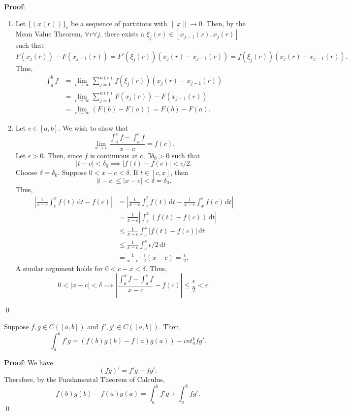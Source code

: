 \noindent \textbf{Proof}:
\begin{enumerate}
    \item Let $\{(\underline{x}(r))\}_r$ be a sequence of partitions with $\lVert \underline{x}\rVert \to 0$. Then, by the Mean Value Theorem, $\forall r\forall j$, there exists a $\xi_j(r)\in [x_{j-1}(r), x_j(r)]$ such that 
    \[
    F(x_j(r)) - F(x_{j-1}(r)) = F'(\xi_j(r))(x_j(r)-x_{j-1}(r)) = f(\xi_j(r)) (x_j(r)-x_{j-1}(r)).
    \]
    Thus, 
    \begin{align*}
        \int_a^b f &= \lim_{r\to \infty} \sum_{j=1}^{n(r)} f(\xi_j(r))(x_j(r)-x_{j-1}(r)) \\
        &= \lim_{r\to \infty} \sum_{j=1}^{n(r)} F(x_j(r)) - F(x_{j-1}(r)) \\
        &= \lim_{r\to \infty} (F(b)-F(a)) = F(b) - F(a).
    \end{align*}
    \item Let $c \in [a,b]$. We wish to show that 
    \[
    \lim_{x\to c} \frac{\int_a^x f- \int_a^c f}{x-c} = f(c).
    \]
    Let $\epsilon>0$. Then, since $f$ is continuous at $c$, $\exists \delta_0>0$ such that 
    \[
    |t-c|< \delta_0 \implies |f(t)-f(c)|<\epsilon/2.
    \]
    Choose $\delta = \delta_0$. Suppose $0< x-c<\delta$. If $t\in [c,x]$, then 
    \[
    |t-c|\leq |x-c| <\delta = \delta_0.
    \]
    Thus, 
    \begin{align*}
        \left|\frac{1}{x-c} \int_c^x f(t) \,\mathrm dt - f(c)\right| &= \left|\frac{1}{x-c}\int_c^t f(t) \,\mathrm dt - \frac{1}{x-c}\int_x^c f(c)\,\mathrm dt\right| \\
        &= \frac{1}{x-c} \left|\int_c^x (f(t)-f(c))\,\mathrm dt\right| \\
        &\leq \frac{1}{x-c}\int_c^x |f(t)-f(c)|\,\mathrm dt \\
        &\leq \frac{1}{x-c}\int_c^x \epsilon/2 \,\mathrm dt \\
        &= \frac{1}{x-c}\cdot \frac{\epsilon}{2} (x-c) = \frac{\epsilon}{2}.
    \end{align*}
    A similar argument holds for $0< c-x<\delta$. Thus, 
    \[
    0 < |x-c|< \delta \implies \left|\frac{\int_a^x f-\int_a^c f}{x-c} - f(c)\right| \leq \frac{\epsilon}{2} < \epsilon.
    \]
\end{enumerate} \qed 

\begin{theorem}
Suppose $f,g\in C([a,b])$ and $f',g'\in C([a,b])$. Then, 
\[
\int_a^b f'g = (f(b)g(b)-f(a)g(a)) -int_a^b fg'.
\]
\end{theorem}
\textbf{Proof}: We have \[
(fg)' = f'g +fg'.
\]
Therefore, by the Fundamental Theorem of Calculus, 
\[
f(b)g(b)-f(a)g(a) = \int_a^b f'g + \int_a^b fg'.
\]\qed 

